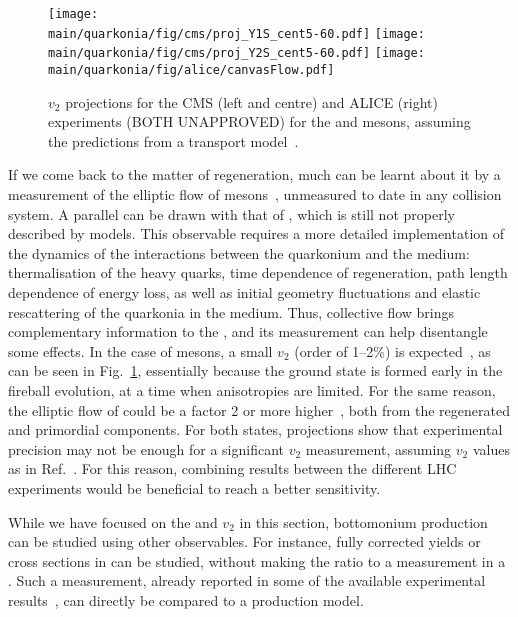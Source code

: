\documentclass[../report.tex]{subfiles}
\providecommand{\main}{..}
\begin{document}
\begin{figure}
\begin{center}
 \texttt{[image: \\main/quarkonia/fig/cms/proj\_Y1S\_cent5-60.pdf]}
 \texttt{[image: \\main/quarkonia/fig/cms/proj\_Y2S\_cent5-60.pdf]}
 \texttt{[image: \\main/quarkonia/fig/alice/canvasFlow.pdf]}
\end{center}

 \caption{$v_2$ projections for the CMS (left and centre) and ALICE (right) experiments (BOTH UNAPPROVED) for the  and  mesons, assuming the predictions from a transport model~\cite{Du:2017qkv}.}
 \label{fig:upsi_v2}
\end{figure}

If we come back to the matter of regeneration, much can be learnt about it by a measurement of the elliptic flow of  mesons~\cite{Das:2018xel}, 
unmeasured to date in any collision system. 
A parallel can be
drawn with that of \PJgy, which is still not properly described by models. This observable requires a more detailed implementation of the dynamics of the interactions between the 
quarkonium and the medium: thermalisation of the heavy quarks, time dependence of regeneration, path length dependence of energy loss, as well as initial geometry fluctuations and 
elastic rescattering of the quarkonia in the medium. Thus, collective flow brings complementary information to the \raa, and its measurement can help disentangle some
effects. In the case of  mesons, a small $v_2$ (order of 1--2\%) is expected~\cite{Du:2017qkv,Yao:2018zrg}, as can be seen in Fig.~\ref{fig:upsi_v2},
essentially because the ground state is formed early in the fireball evolution, at a time when 
anisotropies are limited. For the same reason, the elliptic flow of  could be a factor 2 or more higher~\cite{Du:2017qkv}, both from the regenerated and primordial
components. For both states, projections show that experimental precision may not be enough for a significant $v_2$ measurement, assuming $v_2$ values as in Ref.~\cite{Du:2017qkv}. For this reason,
combining results between the different LHC experiments would be beneficial to reach a better sensitivity.

While we have focused on the \raa and $v_2$ in this section, bottomonium production can be studied using other observables. For instance, fully corrected yields or cross sections
in \PbPb can be studied, without making the ratio to a \pp measurement in a \raa. Such a measurement, already reported in some of the available experimental results~\cite{Sirunyan:2018nsz},
can directly be compared to a production model. 
\end{document}
